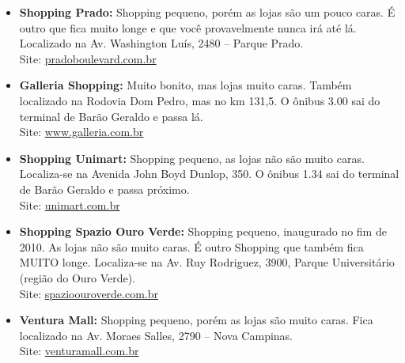 \begin{itemize}
    \item   \textbf{Shopping Prado:} Shopping pequeno, porém as lojas são um 
        pouco caras. É outro que fica muito longe e que você provavelmente nunca 
        irá até lá. Localizado na Av. Washington Luís, 2480 -- Parque Prado.
        \\Site: \url{pradoboulevard.com.br}

    \item   \textbf{Galleria Shopping:} Muito bonito, mas lojas muito caras.
        Também localizado na Rodovia Dom Pedro, mas no km 131,5. O ônibus 3.00
        sai do terminal de Barão Geraldo e passa lá.
        \\Site: \url{www.galleria.com.br}

    \item   \textbf{Shopping Unimart:} Shopping pequeno, as lojas não são muito
        caras. Localiza-se na Avenida John Boyd Dunlop, 350. O ônibus 1.34 sai
        do terminal de Barão Geraldo e passa próximo.
        \\Site: \url{unimart.com.br}
    
    \item   \textbf{Shopping Spazio Ouro Verde:} Shopping pequeno, inaugurado 
        no fim de 2010. As lojas não são muito caras. É outro Shopping que 
        também fica MUITO longe. Localiza-se na Av. Ruy Rodriguez, 3900, 
        Parque Universitário (região do Ouro Verde).
        \\Site: \url{spazioouroverde.com.br}

    \item   \textbf{Ventura Mall:} Shopping pequeno, porém as lojas são muito caras.
        Fica localizado na Av. Moraes Salles, 2790 -- Nova Campinas.
        \\Site: \url{venturamall.com.br}
\end{itemize}
